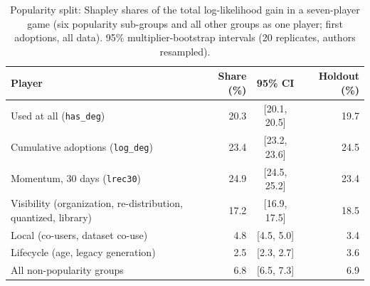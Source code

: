 \begin{table}[htbp]
\centering
\caption{Popularity split: Shapley shares of the total log-likelihood gain in a seven-player game (six popularity sub-groups and all other groups as one player; first adoptions, all data). 95\% multiplier-bootstrap intervals (20 replicates, authors resampled).}
\label{tab:popsplit}
\small
\begin{tabular}{lrcr}
\toprule
Player & Share (\%) & 95\% CI & Holdout (\%) \\
\midrule
Used at all (\texttt{has\_deg}) & 20.3 & [20.1, 20.5] & 19.7 \\
Cumulative adoptions (\texttt{log\_deg}) & 23.4 & [23.2, 23.6] & 24.5 \\
Momentum, 30 days (\texttt{lrec30}) & 24.9 & [24.5, 25.2] & 23.4 \\
Visibility (organization, re-distribution, quantized, library) & 17.2 & [16.9, 17.5] & 18.5 \\
Local (co-users, dataset co-use) & 4.8 & [4.5, 5.0] & 3.4 \\
Lifecycle (age, legacy generation) & 2.5 & [2.3, 2.7] & 3.6 \\
All non-popularity groups & 6.8 & [6.5, 7.3] & 6.9 \\
\bottomrule
\end{tabular}
\end{table}
